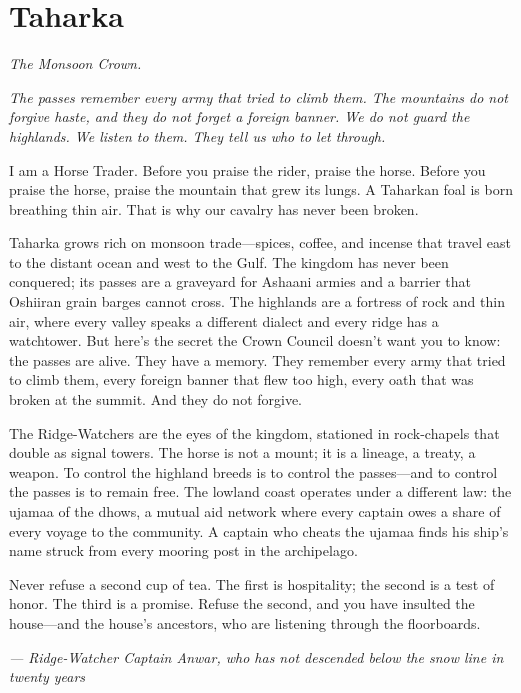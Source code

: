 \newpage

\newpage

\chapter{Taharka}
\emph{The Monsoon Crown.}

\noindent
{\Large
\textit{The passes remember every army that tried to climb them. The mountains do not forgive haste, and they do not forget a foreign banner. We do not guard the highlands. We listen to them. They tell us who to let through.}

\vspace{0.5em}

I am a Horse Trader. Before you praise the rider, praise the horse. Before you praise the horse, praise the mountain that grew its lungs. A Taharkan foal is born breathing thin air. That is why our cavalry has never been broken.

\vspace{0.5em}

Taharka grows rich on monsoon trade---spices, coffee, and incense that travel east to the distant ocean and west to the Gulf. The kingdom has never been conquered; its passes are a graveyard for Ashaani armies and a barrier that Oshiiran grain barges cannot cross. The highlands are a fortress of rock and thin air, where every valley speaks a different dialect and every ridge has a watchtower. But here's the secret the Crown Council doesn't want you to know: the passes are alive. They have a memory. They remember every army that tried to climb them, every foreign banner that flew too high, every oath that was broken at the summit. And they do not forgive.

\vspace{0.5em}

The Ridge-Watchers are the eyes of the kingdom, stationed in rock-chapels that double as signal towers. The horse is not a mount; it is a lineage, a treaty, a weapon. To control the highland breeds is to control the passes---and to control the passes is to remain free. The lowland coast operates under a different law: the ujamaa of the dhows, a mutual aid network where every captain owes a share of every voyage to the community. A captain who cheats the ujamaa finds his ship's name struck from every mooring post in the archipelago.

\vspace{0.5em}

Never refuse a second cup of tea. The first is hospitality; the second is a test of honor. The third is a promise. Refuse the second, and you have insulted the house---and the house's ancestors, who are listening through the floorboards.

\vspace{1em}

\noindent\textit{--- Ridge-Watcher Captain Anwar, who has not descended below the snow line in twenty years}
}

